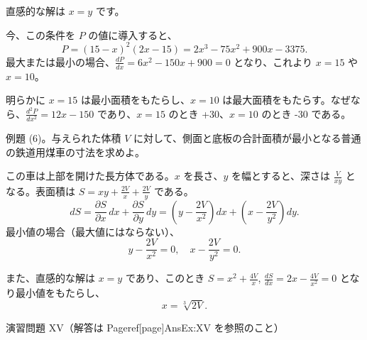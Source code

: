 \documentclass[a4paper,11pt,openany]{ltjsbook}
\begin{document}
直感的な解は \( x = y \) です。

今、この条件を \( P \) の値に導入すると、
\[
P = (15-x)^2 (2x-15) = 2x^3 - 75x^2 + 900x - 3375.
\]
最大または最小の場合、\(\frac{dP}{dx} = 6x^2 - 150x + 900 = 0\) となり、これより \( x = 15 \) や \( x = 10 \)。

明らかに \( x = 15 \) は最小面積をもたらし、\( x = 10 \) は最大面積をもたらす。なぜなら、\(\frac{d^2 P}{dx^2} = 12x - 150\) であり、\( x = 15 \) のとき +30、\( x = 10 \) のとき -30 である。

例題 (6)。与えられた体積 \( V \) に対して、側面と底板の合計面積が最小となる普通の鉄道用煤車の寸法を求めよ。

この車は上部を開けた長方体である。\( x \) を長さ、\( y \) を幅とすると、深さは \( \frac{V}{xy} \) となる。表面積は \( S = xy + \frac{2V}{x} + \frac{2V}{y} \) である。
\[
dS = \frac{\partial S}{\partial x}\, dx
   + \frac{\partial S}{\partial y}\, dy
   = \left(y - \frac{2V}{x^2}\right) dx
   + \left(x - \frac{2V}{y^2}\right) dy.
\]
最小値の場合（最大値にはならない）、
\[
y - \frac{2V}{x^2} = 0,\quad
x - \frac{2V}{y^2} = 0.
\]

また、直感的な解は \( x = y \) であり、このとき
\( S = x^2 + \frac{4V}{x} \), \(\frac{dS}{dx}= 2x - \frac{4V}{x^2} = 0\) となり最小値をもたらし、
\[
x = \sqrt[3]{2V}.
\]

演習問題 XV（解答は Pageref[page]{AnsEx:XV} を参照のこと）
\end{document}
